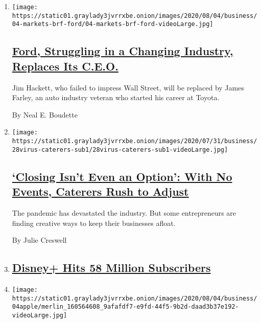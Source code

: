 \begin{enumerate}
\def\labelenumi{\arabic{enumi}.}
\item
  \texttt{[image: https://static01.graylady3jvrrxbe.onion/images/2020/08/04/business/04-markets-brf-ford/04-markets-brf-ford-videoLarge.jpg]}

  \hypertarget{ford-struggling-in-a-changing-industry-replaces-its-ceo}{%
  \subsection{\texorpdfstring{\href{/2020/08/04/business/ford-jim-hackett-james-farley.html}{Ford,
  Struggling in a Changing Industry, Replaces Its
  C.E.O.}}{Ford, Struggling in a Changing Industry, Replaces Its C.E.O.}}\label{ford-struggling-in-a-changing-industry-replaces-its-ceo}}

  Jim Hackett, who failed to impress Wall Street, will be replaced by
  James Farley, an auto industry veteran who started his career at
  Toyota.

  By Neal E. Boudette
\item
  \texttt{[image: https://static01.graylady3jvrrxbe.onion/images/2020/07/31/business/28virus-caterers-sub1/28virus-caterers-sub1-videoLarge.jpg]}

  \hypertarget{closing-isnt-even-an-option-with-no-events-caterers-rush-to-adjust}{%
  \subsection{\texorpdfstring{\href{/2020/08/04/business/coronavirus-struggling-caterers.html}{`Closing
  Isn't Even an Option': With No Events, Caterers Rush to
  Adjust}}{`Closing Isn't Even an Option': With No Events, Caterers Rush to Adjust}}\label{closing-isnt-even-an-option-with-no-events-caterers-rush-to-adjust}}

  The pandemic has devastated the industry. But some entrepreneurs are
  finding creative ways to keep their businesses afloat.

  By Julie Creswell
\item
  \hypertarget{disney-hits-58-million-subscribers}{%
  \subsection{\texorpdfstring{\href{https://www.nytimes3xbfgragh.onion/live/2020/08/04/business/stock-market-today-coronavirus}{Disney+
  Hits 58 Million
  Subscribers}}{Disney+ Hits 58 Million Subscribers}}\label{disney-hits-58-million-subscribers}}
\item
  \texttt{[image: https://static01.graylady3jvrrxbe.onion/images/2020/08/04/business/04apple/merlin\_160564608\_9afafdf7-e9fd-44f5-9b2d-daad3b37e192-videoLarge.jpg]}


\end{enumerate}
